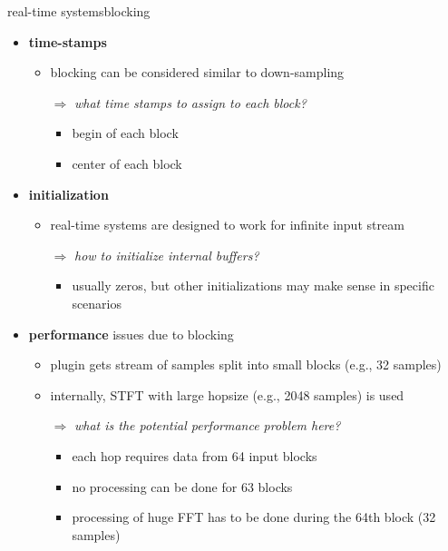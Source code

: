 	\begin{frame}{real-time systems}{blocking}
        \vspace{-3mm}
        \begin{itemize}
            \item   \textbf{time-stamps}
                \begin{itemize}
                    \item   blocking can be considered similar to down-sampling
                    \item[$\Rightarrow$]   \textit{what time stamps to assign to each block?}
                        \begin{itemize}
                            \item   begin of each block
                            \item   center of each block
                        \end{itemize}
                \end{itemize}
            \bigskip
            \item<2->   \textbf{initialization}
                \begin{itemize}
                    \item   real-time systems are designed to work for infinite input stream
                    \item[$\Rightarrow$]   \textit{how to initialize internal buffers?}
                        \begin{itemize}
                            \item   usually zeros, but other initializations may make sense in specific scenarios
                        \end{itemize}
                \end{itemize}
            \bigskip
            \item<3->   \textbf{performance} issues due to blocking
                \begin{itemize}
                    \item   plugin gets stream of samples split into small blocks (e.g., 32 samples)
                    \item   internally, STFT with large hopsize (e.g., 2048 samples) is used 
                    \item[$\Rightarrow$]   \textit{what is the potential performance problem here?}
                        \begin{itemize}
                            \item<4->   each hop requires data from 64 input blocks
                            \item<4->[$\Rightarrow$]   no processing can be done for 63 blocks
                            \item<4->[$\Rightarrow$]   processing of huge FFT has to be done during the 64th block (32 samples)
                        \end{itemize}
                \end{itemize}
       \end{itemize}
    \end{frame}
    
